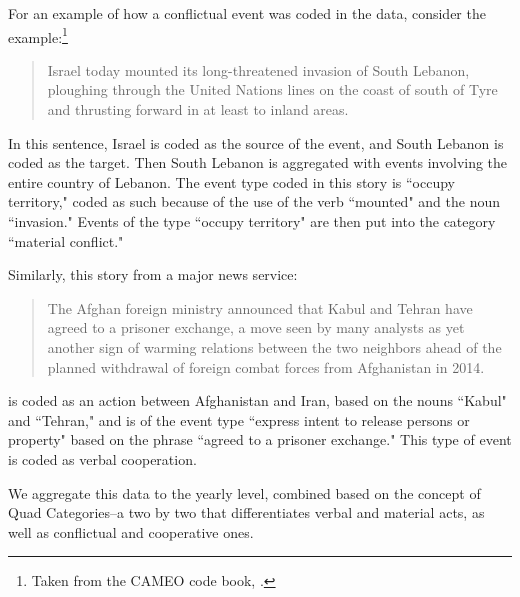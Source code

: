 \documentclass[fignum,letterpaper,12pt]{amsart}
\begin{document}
For an example of how a conflictual event was coded in the data, consider the example:\footnote{Taken from the CAMEO code book, \citep{gerner:2009}.}

\begin{quote}
Israel today mounted its long-threatened invasion of South Lebanon, ploughing through the United Nations lines on the coast of south of Tyre and thrusting forward in at least to inland areas.
\end{quote}

In this sentence, Israel is coded as the source of the event, and South Lebanon is coded as the target. Then South Lebanon is aggregated with events involving the entire country of Lebanon. The event type coded in this story is ``occupy territory," coded as such because of the use of the verb ``mounted" and the noun ``invasion." Events of the type ``occupy territory" are then put into the category ``material conflict." 

Similarly, this story from a major news service:

\begin{quote}The Afghan foreign ministry announced that Kabul and Tehran have agreed to a prisoner exchange, a move seen by many analysts as yet another sign of warming relations between the two neighbors ahead of the planned withdrawal of foreign combat forces from Afghanistan in 2014.
\end{quote}

is coded as an action between Afghanistan and Iran, based on the nouns ``Kabul" and ``Tehran," and is of the event type ``express intent to release persons or property" based on the phrase ``agreed to a prisoner exchange." This type of event is coded as verbal cooperation.

We aggregate this data to the yearly level, combined based on the concept of Quad Categories--a two by two that differentiates verbal and material acts, as well as conflictual and cooperative ones.
\end{document}
